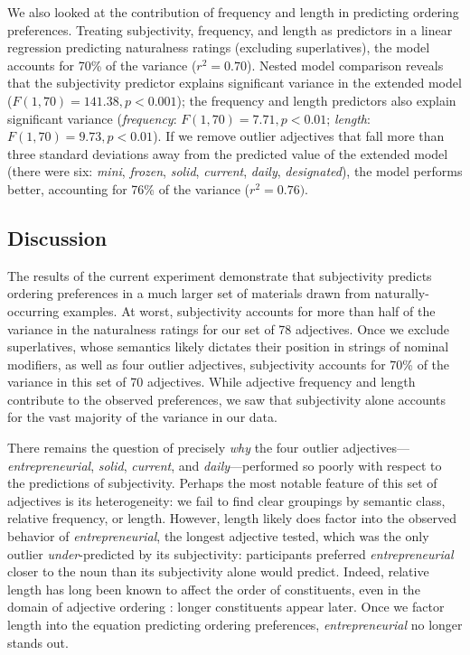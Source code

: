 \documentclass[12pt]{article}
\newcommand{\ndg}[1]{\textcolor{Green}{[ndg: #1]}}
\begin{document}
We also looked at the contribution of frequency and length in predicting ordering preferences. Treating subjectivity, frequency, and length as predictors in a linear regression predicting naturalness ratings (excluding superlatives), the model accounts for 70\% of the variance ($r^{2}=0.70$). {Nested model comparison reveals that the subjectivity predictor explains significant variance in the extended model ($F(1,70) = 141.38, p < 0.001$); the frequency and length predictors also explain significant variance (\emph{frequency}: $F(1,70) = 7.71, p < 0.01$; \emph{length}: $F(1,70) = 9.73, p < 0.01$).}
If we remove outlier adjectives that fall more than three standard deviations away from the predicted value of the extended model (there were six: \emph{mini}, \emph{frozen}, \emph{solid}, \emph{current}, \emph{daily}, \emph{designated}), the model performs better, accounting for 76\% of the variance ($r^{2}=0.76)$.

\subsection{Discussion}

The results of the current experiment demonstrate that subjectivity predicts ordering preferences %
in a much larger set of materials drawn from naturally-occurring examples. At worst, subjectivity accounts for more than half of the variance in the naturalness ratings for our set of 78 adjectives. Once we exclude superlatives, whose semantics likely dictates their position in strings of nominal modifiers, as well as four outlier adjectives, subjectivity accounts for 70\% of the variance in this set of 70 adjectives. While adjective frequency and length contribute to the observed preferences, we saw that subjectivity alone accounts for the vast majority of the variance in our data.

There remains the question of precisely \emph{why} the four outlier adjectives---​\emph{entrepreneurial}​, ​\emph{solid}​, ​\emph{current}​, and ​\emph{daily}---performed so poorly with respect to the predictions of subjectivity. Perhaps the most notable feature of this set of adjectives is its heterogeneity: we fail to find clear groupings by semantic class, relative frequency, or length. However, length likely does factor into the observed behavior of \emph{entrepreneurial}, the longest adjective tested, which was the only outlier \emph{under}-predicted by its subjectivity: participants preferred \emph{entrepreneurial} closer to the noun than its subjectivity alone would predict. Indeed, relative length has long been known to affect the order of constituents, even in the domain of adjective ordering \citep{wulff2003}: longer constituents appear later. Once we factor length into the equation predicting ordering preferences, \emph{entrepreneurial} no longer stands out.
\end{document}
